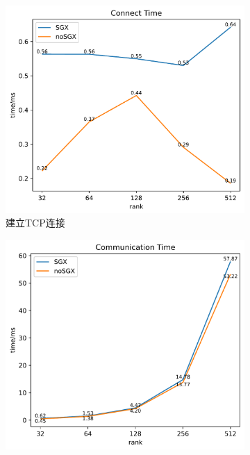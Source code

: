 \begin{figure}[!ht]
    \centering
    \begin{subfigure}{0.4\textwidth}
        \centering
        \includegraphics[width=\textwidth]{figures/matrix_connect.pdf}
        \caption{建立TCP连接}
    \end{subfigure}
    \begin{subfigure}{0.4\textwidth}
        \centering
        \includegraphics[width=\textwidth]{figures/matrix_communication.pdf}

\end{subfigure}
\end{figure}
